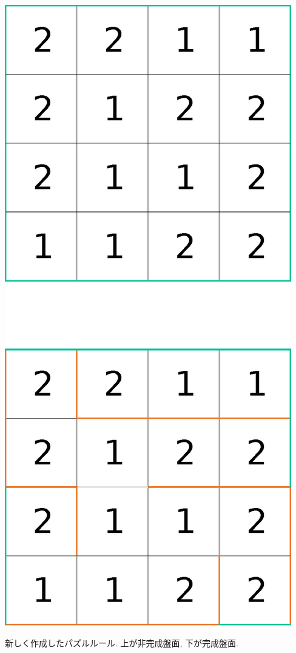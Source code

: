 \begin{clearpagefigure}
  \includegraphics[width=0.5\linewidth,clip]{fig/NewPuzzleRule.eps}
  \caption{新しく作成したパズルルール. 上が非完成盤面, 下が完成盤面. }
  \label{figure:NewPuzzleRule}
\end{clearpagefigure}
